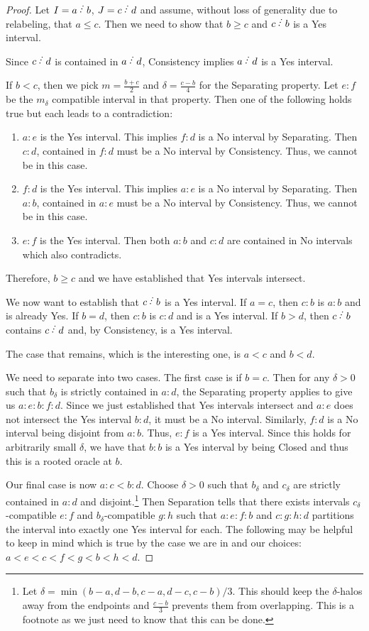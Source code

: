 \documentclass[12pt]{article}
\begin{document}
\begin{proof}
Let $I = a \lte b$, $J = c \lte d$ and assume, without loss of generality due to relabeling, that $ a\leq c$. Then we need to show that $b \geq c$ and $c \lte b$ is a Yes interval. 

Since $c \lte d$ is contained in $a \lte d$, Consistency implies $a \lte d$ is a Yes interval. 

If $b < c$, then we pick $m = \frac{b + c}{2}$ and $\delta = \frac{c-b}{4}$ for the Separating property. Let $e:f$ be the $m_\delta$ compatible interval in that property. Then one of the following holds true but each leads to a contradiction:
\begin{enumerate}
    \item $a:e$ is the Yes interval. This implies $f:d$ is a No interval by Separating. Then $c:d$, contained in $f:d$ must be a No interval by Consistency. Thus, we cannot be in this case. 
    \item $f:d$ is the Yes interval. This implies $a:e$ is a No interval by Separating. Then $a:b$, contained in $a:e$ must be a No interval by Consistency. Thus, we cannot be in this case. 
    \item $e:f$ is the Yes interval. Then both $a:b$ and $c:d$ are contained in No intervals which also contradicts. 
\end{enumerate}
Therefore, $b \geq c$ and we have established that Yes intervals intersect. 

We now want to establish that $c\lte b$ is a Yes interval. If $a=c$, then $c:b$ is $a:b$ and is already Yes. If $b=d$, then $c:b$ is $c:d$ and is a Yes interval. If $b > d$, then $c \lte b$ contains $c \lte d$ and, by Consistency, is a Yes interval. 

The case that remains, which is the interesting one, is $a < c$ and $ b < d$. 

We need to separate into two cases. The first case is if $b=c$. Then for any $\delta > 0$ such that $b_\delta$ is strictly contained in $a:d$, the Separating property applies to give us $a:e:b:f:d$. Since we just established that Yes intervals intersect and $a:e$ does not intersect the Yes interval $b:d$, it must be a No interval. Similarly, $f:d$ is a No interval being disjoint from $a:b$. Thus, $e:f$ is a Yes interval. Since this holds for arbitrarily small $\delta$, we have that $b:b$ is a Yes interval by being Closed and thus this is a rooted oracle at $b$. 

Our final case is now $a:c\lt b :d$. Choose $\delta > 0$ such that $b_\delta$ and $c_\delta$ are strictly contained in $a:d$ and disjoint.\footnote{Let $\delta = \min(b-a, d-b, c-a, d-c, c-b)/3$. This should keep the $\delta$-halos away from the endpoints and $\frac{c-b}{3}$ prevents them from overlapping. This is a footnote as we just need to know that this can be done.} Then Separation tells that there exists intervals $c_\delta$-compatible $e:f$ and $b_\delta$-compatible $g:h$ such that $a:e:f:b$ and $c:g:h:d$ partitions the interval into exactly one Yes interval for each. The following may be helpful to keep in mind which is true by the case we are in and our choices: $a < e < c < f< g < b < h < d$.


\end{proof}
\end{document}
